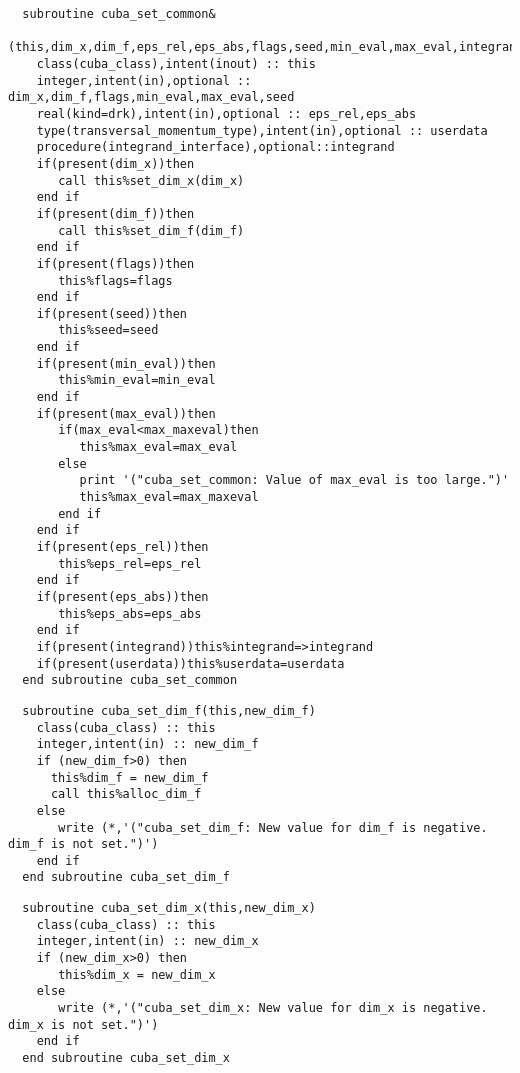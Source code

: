 \begin{Verbatim}
  subroutine cuba_set_common&
    (this,dim_x,dim_f,eps_rel,eps_abs,flags,seed,min_eval,max_eval,integrand,userdata)
    class(cuba_class),intent(inout) :: this
    integer,intent(in),optional :: dim_x,dim_f,flags,min_eval,max_eval,seed
    real(kind=drk),intent(in),optional :: eps_rel,eps_abs
    type(transversal_momentum_type),intent(in),optional :: userdata
    procedure(integrand_interface),optional::integrand
    if(present(dim_x))then
       call this%set_dim_x(dim_x)
    end if
    if(present(dim_f))then
       call this%set_dim_f(dim_f)
    end if
    if(present(flags))then
       this%flags=flags
    end if
    if(present(seed))then
       this%seed=seed
    end if    
    if(present(min_eval))then
       this%min_eval=min_eval
    end if
    if(present(max_eval))then
       if(max_eval<max_maxeval)then
          this%max_eval=max_eval
       else
          print '("cuba_set_common: Value of max_eval is too large.")'
          this%max_eval=max_maxeval
       end if
    end if
    if(present(eps_rel))then
       this%eps_rel=eps_rel
    end if
    if(present(eps_abs))then
       this%eps_abs=eps_abs
    end if
    if(present(integrand))this%integrand=>integrand
    if(present(userdata))this%userdata=userdata
  end subroutine cuba_set_common
\end{Verbatim}

\begin{Verbatim}
  subroutine cuba_set_dim_f(this,new_dim_f)
    class(cuba_class) :: this
    integer,intent(in) :: new_dim_f
    if (new_dim_f>0) then
      this%dim_f = new_dim_f
      call this%alloc_dim_f
    else
       write (*,'("cuba_set_dim_f: New value for dim_f is negative. dim_f is not set.")')
    end if
  end subroutine cuba_set_dim_f
\end{Verbatim}

\begin{Verbatim}
  subroutine cuba_set_dim_x(this,new_dim_x)
    class(cuba_class) :: this
    integer,intent(in) :: new_dim_x
    if (new_dim_x>0) then
       this%dim_x = new_dim_x
    else
       write (*,'("cuba_set_dim_x: New value for dim_x is negative. dim_x is not set.")')
    end if
  end subroutine cuba_set_dim_x
\end{Verbatim}


